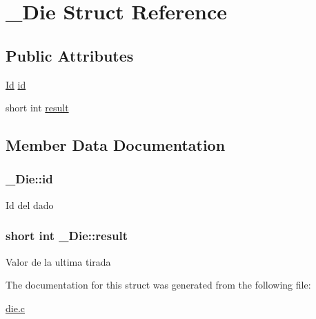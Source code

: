 \hypertarget{struct__Die}{}\section{\+\_\+\+Die Struct Reference}
\label{struct__Die}
\subsection*{Public Attributes}
\begin{DoxyCompactItemize}
\item 
\hyperlink{types_8h_a845e604fb28f7e3d97549da3448149d3}{Id} \hyperlink{struct__Die_a0887af562dda760409957f13619d36f1}{id}
\item 
short int \hyperlink{struct__Die_a93f9aa650af74c81ab2377ceb7324250}{result}
\end{DoxyCompactItemize}


\subsection{Member Data Documentation}
\subsubsection[{\texorpdfstring{id}{id}}]{ \+\_\+\+Die\+::id}\hypertarget{struct__Die_a0887af562dda760409957f13619d36f1}{}\label{struct__Die_a0887af562dda760409957f13619d36f1}
Id del dado 
\subsubsection[{\texorpdfstring{result}{result}}]{\setlength{\rightskip}{0pt plus 5cm}short int \+\_\+\+Die\+::result}\hypertarget{struct__Die_a93f9aa650af74c81ab2377ceb7324250}{}\label{struct__Die_a93f9aa650af74c81ab2377ceb7324250}
Valor de la ultima tirada 

The documentation for this struct was generated from the following file\+:\begin{DoxyCompactItemize}
\item 
\hyperlink{die_8c}{die.\+c}\end{DoxyCompactItemize}
